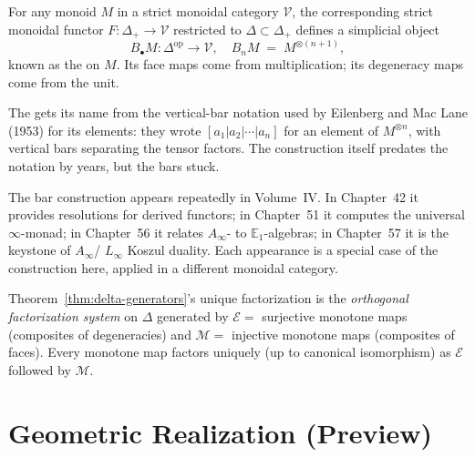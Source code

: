\begin{corollary}
\label{cor:bar-construction}
For any monoid $M$ in a strict monoidal category $\mathcal{V}$, the
corresponding strict monoidal functor $F : \Delta_+ \to \mathcal{V}$
restricted to $\Delta \subset \Delta_+$ defines a simplicial object
\begin{equation*}
  B_\bullet M : \Delta^{\mathrm{op}} \to \mathcal{V}, \quad
  B_n M \;=\; M^{\otimes (n+1)},
\end{equation*}
known as the  on $M$. Its face maps come from
multiplication; its degeneracy maps come from the unit.
\end{corollary}

\begin{nameorigin}
The  gets its name from the vertical-bar notation
used by Eilenberg and Mac Lane (1953) for its elements: they wrote
$[a_1 | a_2 | \cdots | a_n]$ for an element of $M^{\otimes n}$, with
vertical bars separating the tensor factors. The construction itself
predates the notation by years, but the bars stuck.
\end{nameorigin}

\begin{remark}
The bar construction appears repeatedly in Volume~IV. In Chapter~42 it
provides resolutions for derived functors; in Chapter~51 it computes the
universal $\infty$-monad; in Chapter~56 it relates $A_\infty$- to
$\mathbb{E}_1$-algebras; in Chapter~57 it is the keystone of $A_\infty$/
$L_\infty$ Koszul duality. Each appearance is a special case of the
construction here, applied in a different monoidal category.
\end{remark}

\begin{corollary}
\label{cor:epi-mono}
Theorem~\ref{thm:delta-generators}'s unique factorization is the
\emph{orthogonal factorization system} on $\Delta$ generated by
$\mathcal{E} = $ surjective monotone maps (composites of degeneracies)
and $\mathcal{M} = $ injective monotone maps (composites of faces).
Every monotone map factors uniquely (up to canonical isomorphism) as
$\mathcal{E}$ followed by $\mathcal{M}$.
\end{corollary}


\section{Geometric Realization (Preview)}
\label{sec:geometric-realization-preview}

